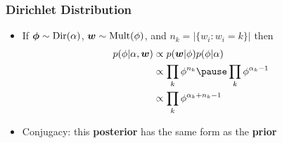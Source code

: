 \begin{frame}
\frametitle{Dirichlet Distribution}
\begin{itemize}
  \item If ${\mbox{\boldmath$\phi$}} \sim \mathrm{Dir}(\alpha)$, ${\mbox{\boldmath$w$}} \sim \mathrm{Mult}(\phi)$, and $n_k = |\{ w_i : w_i = k\}|$ then
  \begin{align}
  	p(\phi | \alpha, {\bm w}) & \propto p({\bm w} | \phi) p(\phi | \alpha) \\
	                       & \propto  \prod_{k} \phi^{n_k} \pause  \prod_k { \phi^{\alpha_k - 1}} \\
	                       & \propto \prod_k \phi^{\alpha_k + n_k - 1}
  \end{align}
  \item Conjugacy: this {\bf posterior} has the same form as the {\bf prior}
\end{itemize}
\end{frame}

\fi

\ifhighlevel

\else

